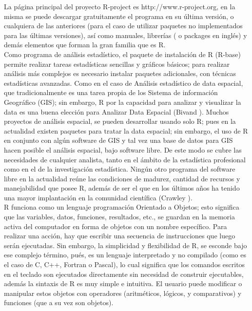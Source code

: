 \documentclass[12pt]{report}
\begin{document}
			La página principal del proyecto  R-project es  http://www.r-project.org, en la misma se puede descargar gratuitamente el programa en su última versión, o cualquiera de las anteriores (para el caso de utilizar paquetes no implementados para las últimas versiones), así como manuales, librerías ( o packages en inglés) y demás elementos que forman la gran familia que es R.\\
			
			
			Como programa de análisis estadístico, el paquete de instalación de R (R-base) permite realizar tareas estadísticas sencillas y gráficos básicos; para realizar análisis  más complejos es necesario instalar paquetes adicionales, con  técnicas estadísticas avanzadas. Como en el caso de Análisis estadístico de data espacial, que  tradicionalmente es una tarea propia de los Sistema de información Geográfico (GIS); sin embargo, R  por la capacidad para  analizar y visualizar la data  es una buena elección para Analizar Data Espacial (Bivand  \cite{Roger}).   Muchos proyectos de análisis espacial, se pueden desarrollar usando solo R; pues en la actualidad existen paquetes para tratar la data espacial; sin embargo, el uso de R en conjunto con algún software de GIS y tal vez una  base de datos para GIS hacen posible el análisis espacial, bajo software libre. 	De este modo se cubre las necesidades de cualquier analista, tanto en el ámbito de la estadística profesional como en el de la investigación estadística.  Ningún otro programa del software libre en la actualidad reúne las condiciones de madurez, cantidad de recursos y manejabilidad que posee R, además de ser el que en los últimos años ha tenido una mayor implantación en la comunidad científica (Crawley \cite{Michael}).\\  %
		
					
			R funciona como un lenguaje programación Orientado a Objetos; esto significa que las variables, datos, funciones, resultados, etc., se guardan  en la memoria activa del computador en forma de objetos con un nombre específico. Para realizar una acción, hay que  escribir una secuencia de instrucciones que luego serán ejecutadas. Sin embargo,  la simplicidad y flexibilidad de R, se esconde bajo ese complejo término, pués, es un lenguaje interpretado  y no compilado (como es el caso de C,  C++, Fortran o Pascal), lo cual significa que los comandos escritos en el teclado son ejecutados  directamente sin necesidad de construir ejecutables, además la sintaxis de R es muy simple e intuitiva. El usuario puede modificar o manipular estos objetos con operadores (aritméticos, lógicos, y comparativos)  y funciones (que a su vez son objetos). \\ 
			
\end{document}
